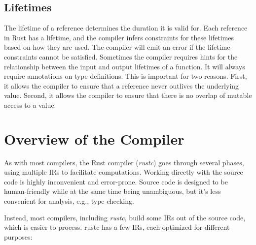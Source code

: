 \documentclass[paper=a4,%
  twoside,%
  BCOR4mm,%
  abstract=true,%
  toc=bibliography,%
  chapterprefix=true,%
  toc=bibliographynumbered,%
  open=right,%
  english,%
  pagesize=pdftex]{scrreprt}
\begin{document}
\subsection{Lifetimes}
The lifetime of a reference determines the duration it is valid for. Each reference in Rust has a lifetime, and the compiler infers constraints for these lifetimes based on how they are used. The compiler will emit an error if the lifetime constraints cannot be satisfied. Sometimes the compiler requires hints for the relationship between the input and output lifetimes of a function. It will always require annotations on type definitions. This is important for two reasons. First, it allows the compiler to ensure that a reference never outlives the underlying value. Second, it allows the compiler to ensure that there is no overlap of mutable access to a value.

\section{Overview of the Compiler}
As with most compilers, the Rust compiler (\emph{rustc}) goes through several phases, using multiple \acp{IR} to facilitate computations. Working directly with the source code is highly inconvenient and error-prone. Source code is designed to be human-friendly while at the same time being unambiguous, but it's less convenient for analysis, e.g., type checking.

Instead, most compilers, including \emph{rustc}, build some \acp{IR} out of the source code, which is easier to process. rustc has a few \acp{IR}, each optimized for different purposes:
\end{document}
